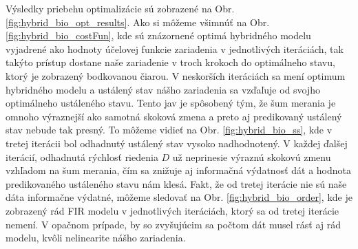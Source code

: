Výsledky priebehu optimalizácie sú zobrazené na Obr. \ref{fig:hybrid_bio_opt_results}. Ako si môžeme všimnúť na Obr. \ref{fig:hybrid_bio_costFun}, kde sú znázornené optimá hybridného modelu vyjadrené ako hodnoty účelovej funkcie zariadenia v jednotlivých iteráciách, tak takýto prístup dostane naše zariadenie v troch krokoch do optimálneho stavu, ktorý je zobrazený bodkovanou čiarou. V neskorších iteráciách sa mení optimum hybridného modelu a ustálený stav nášho zariadenia sa vzďaľuje od svojho optimálneho ustáleného stavu. Tento jav je spôsobený tým, že šum merania je omnoho výraznejší ako samotná skoková zmena a preto aj predikovaný ustálený stav nebude tak presný. To môžeme vidieť na Obr. \ref{fig:hybrid_bio_ss}, kde v tretej iterácii bol odhadnutý ustálený stav vysoko nadhodnotený. V každej ďalšej iterácií, odhadnutá rýchlosť riedenia $ D $ už neprinesie výraznú skokovú zmenu vzhľadom na šum merania, čím sa znižuje aj informačná výdatnosť dát a hodnota predikovaného ustáleného stavu nám klesá. Fakt, že od tretej iterácie nie sú naše dáta informačne výdatné, môžeme sledovať na Obr. \ref{fig:hybrid_bio_order}, kde je zobrazený rád FIR modelu v jednotlivých iteráciách, ktorý sa od tretej iterácie nemení. V opačnom prípade, by so zvyšujúcim sa počtom dát musel rásť aj rád modelu, kvôli nelinearite nášho zariadenia.
